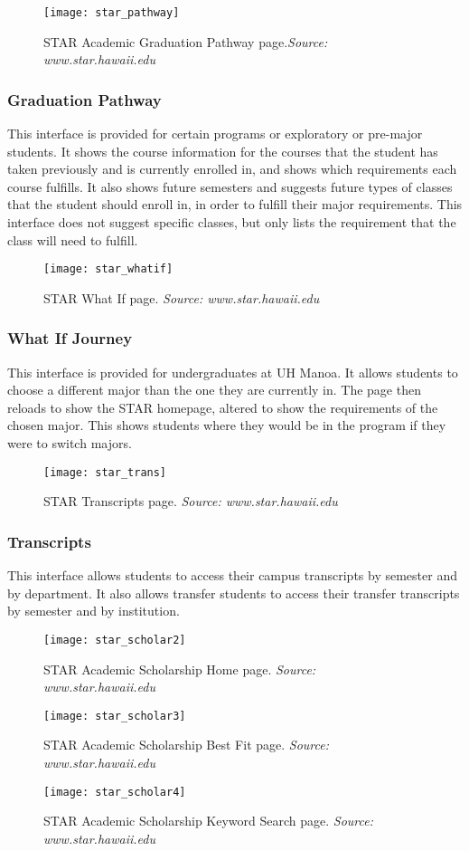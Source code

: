 \begin{figure}[h]
\centering
\texttt{[image: star\_pathway]}
\caption{STAR Academic Graduation Pathway page.\textit{Source: www.star.hawaii.edu}}
\end{figure}

\subsubsection{Graduation Pathway}
This interface is provided for certain programs or exploratory or pre-major students. It shows the course information for the courses that the student has taken previously and is currently enrolled in, and shows which requirements each course fulfills. It also shows future semesters and suggests future types of classes that the student should enroll in, in order to fulfill their major requirements. This interface does not suggest specific classes, but only lists the requirement that the class will need to fulfill. 

\begin{figure}[h]
\centering
\texttt{[image: star\_whatif]}
\caption{STAR What If page. \textit{Source: www.star.hawaii.edu}}
\end{figure}

\subsubsection{What If Journey}
This interface is provided for undergraduates at UH Manoa. It allows students to choose a different major than the one they are currently in. The page then reloads to show the STAR homepage, altered to show the requirements of the chosen major. This shows students where they would be in the program if they were to switch majors.

\begin{figure}[h]
\centering
\texttt{[image: star\_trans]}
\caption{STAR Transcripts page. \textit{Source: www.star.hawaii.edu}}
\end{figure}

\subsubsection{Transcripts}
This interface allows students to access their campus transcripts by semester and by department. It also allows transfer students to access their transfer transcripts by semester and by institution. 
\begin{figure}[h]
\centering
\texttt{[image: star\_scholar2]}
\caption{STAR Academic Scholarship Home page. \textit{Source: www.star.hawaii.edu}}
\end{figure}
\begin{figure}[h]
\centering
\texttt{[image: star\_scholar3]}
\caption{STAR Academic Scholarship Best Fit page. \textit{Source: www.star.hawaii.edu}}
\end{figure}
\begin{figure}[h]
\centering
\texttt{[image: star\_scholar4]}
\caption{STAR Academic Scholarship Keyword Search page. \textit{Source: www.star.hawaii.edu}}
\end{figure}
